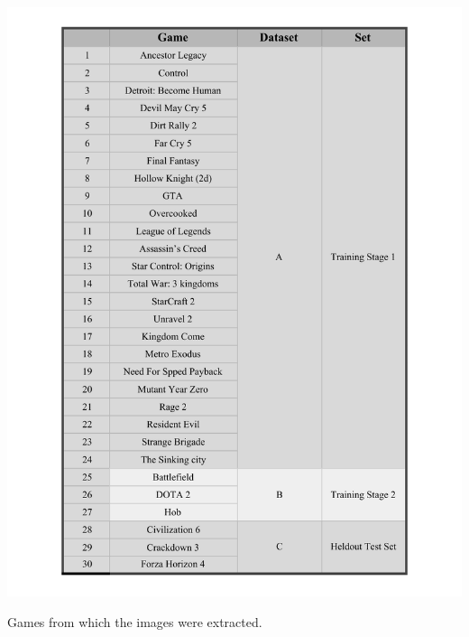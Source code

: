 \begin{table}[h]
\centering
\includegraphics[scale=0.8]{tables/games.pdf}
\caption{Games from which the images were extracted.}
\label{games}
\end{table}


\endinput
